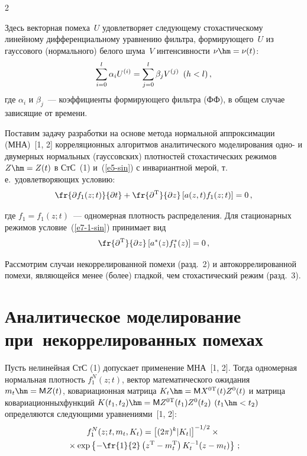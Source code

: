 \begin{multicols}{2}
    
    \noindent
    Здесь векторная помеха~$U$ удовлетворяет следующему стохастическому 
линейному дифференциальному уравнению фильтра, формирующего~$U$ из 
гауссового (нормального) белого шума~$V$ интенсивности $\nu\hm=\nu(t)$:
    \begin{equation}
    \sum\limits_{i=0}^l \alpha_i U^{(i)} =\sum\limits_{j=0}^l \beta_j 
V^{(j)}\enskip (h<l)\,,
    \label{e6-sin}
    \end{equation}
где $\alpha_i$ и $\beta_j$~--- коэффициенты формирующего фильт\-ра (ФФ), в 
общем случае зависящие от времени.
    
    Поставим задачу разработки на основе метода нормальной аппроксимации 
(МНА)~[1, 2] корреляционных алгоритмов аналитического моделирования 
одно- и двумерных нормальных (гауссовских) плот\-но\-стей стохастических 
режимов $Z\hm=Z(t)$ в СтС~(1) и~(\ref{e5-sin}) с инвариантной мерой, т.\,е.\ 
удовлетворяющих условию: 
    \renewcommand{\theequation}{\arabic{equation}$^\prime$}
    \begin{equation}
    \fr{\partial  f_1(z;t)}{\partial t} +\fr{\partial^{\mathrm{T}}}{\partial z}\left[ 
a(z,t)f_1(z;t)\right]=0\,,
     \label{e7-1-sin}
     \end{equation}
     \setcounter{equation}{5}
     
\noindent
где $f_1=f_1(z;t)$~--- одномерная плот\-ность распределения. Для стационарных 
режимов условие~(\ref{e7-1-sin}) принимает вид 
    \renewcommand{\theequation}{\arabic{equation}$^{\prime\prime}$}
    \begin{equation}
    \fr{\partial^{\mathrm{T}}}{\partial z} \left[ a^*(z)f_1^*(z)\right] =0\,,
    \label{e7-2-sin}
    \end{equation}
    \renewcommand{\theequation}{\arabic{equation}}
    \setcounter{equation}{6}
  
  Рассмотрим случаи некоррелированной помехи (разд.~2) и 
автокоррелированной помехи, явля\-ющей\-ся менее (более) гладкой, чем 
стохастический режим (разд.~3).
  
\section{Аналитическое моделирование при~некоррелированных 
помехах}
  
  Пусть нелинейная СтС (1) допускает применение МНА~[1, 2]. Тогда 
одномерная нормальная плот\-ность $f_1^N(z;t)$, вектор математического 
ожидания $m_t\hm={\sf M}Z(t)$, ковариационная мат\-ри\-ца $K_t\hm= {\sf M}X^{0\mathrm{T}}(t) 
Z^0(t)$ и мат\-ри\-ца ковариационных\linebreak функций 
$K(t_1,t_2)\hm={\sf M}Z^{0\mathrm{T}}(t_1)Z^0(t_2)$ $(t_1\hm<t_2)$ опре\-де\-ля\-ют\-ся 
следующими урав\-не\-ни\-ями~[1, 2]:
  \begin{multline}
  f_1^N(z;t,m_t,K_t) =\left[ (2\pi)^k\vert K_t\vert \right]^{-1/2}\times{}\\
  {}\times \exp \left\{ -
\fr{1}{2} \left( z^{\mathrm{T}}-m_t^{\mathrm{T}}\right) K_t^{-1}(z-m_t)\right\}\,;\label{e8-sin}
  \end{multline}
  

\end{multicols}
